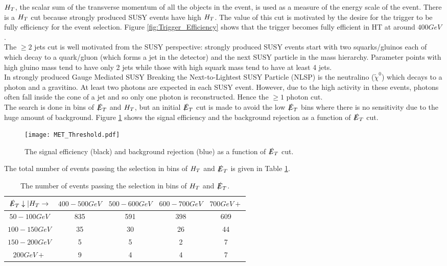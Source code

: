 $H_{T}$, the scalar sum of the transverse momentum of all the objects in the 
event, is used as a measure of the energy scale of the event. There is a $H_{T}$ 
cut because strongly produced SUSY events have high $H_{T}$. The value of this cut
is motivated by the desire for the trigger to be fully efficiency for the event
selection. Figure \ref{fig:Trigger_Efficiency} shows that the trigger becomes
fully efficient in HT at around $400\unit{GeV}$. \\

The $\geq 2$ jets cut is well motivated from the SUSY perspective: strongly
produced SUSY events start with two squarks/gluinos each of which decay to a 
quark/gluon (which forms a jet in the detector) and the next SUSY particle in 
the mass hierarchy. Parameter points with high gluino mass tend to have only 2 
jets while those with high squark mass tend to have at least 4 jets. \\

In strongly produced Gauge Mediated SUSY Breaking the Next-to-Lightest SUSY 
Particle (NLSP) is the neutralino ($\tilde{\chi}^{0}$) which decays to a photon 
and a gravitino. At least two photons are expected in each SUSY event. However, 
due to the high activity in these events, photons often fall inside the cone of
a jet and so only one photon is reconstructed. Hence the $\geq 1$ photon cut. \\

The search is done in bins of $\slashed{E}_{T}$ and $H_{T}$, but an initial $\slashed{E}_{T}$ cut is
made to avoid the low $\slashed{E}_{T}$ bins where there is no sensitivity due to the huge
amount of background. Figure \ref{fig:met_threshold} shows the signal efficiency
and the background rejection as a function of $\slashed{E}_{T}$ cut.

\begin{figure}
\begin{center}
\texttt{[image: MET\_Threshold.pdf]}
\end{center}
\caption{The signal efficiency (black) and background rejection (blue) as a
function of $\slashed{E}_{T}$ cut.}
\label{fig:met_threshold}
\end{figure}

The total number of events passing the selection in bins of $H_{T}$ and $\slashed{E}_{T}$ is
given in Table \ref{tab:events}.

\begin{table}
\begin{center}
\begin{tabular}{|c|c|c|c|c|}
\hline
$\slashed{E}_{T}\downarrow | H_{T}\rightarrow$ & $400-500\unit{GeV}$ & $500-600\unit{GeV}$ 
& $600-700\unit{GeV}$ & $700\unit{GeV}+$ \\ 
\hline
$50-100\unit{GeV}$ & 835 & 591 & 398 & 609 \\
\hline
$100-150\unit{GeV}$ & 35 & 30 & 26 & 44 \\
\hline
$150-200\unit{GeV}$ & 5 & 5 & 2 & 7 \\
\hline
$200\unit{GeV}+$ & 9 & 4 & 4 & 7 \\
\hline
\end{tabular}
\end{center}
\caption{The number of events passing the selection in bins of $H_{T}$ and $\slashed{E}_{T}$.}
\label{tab:events}
\end{table}
